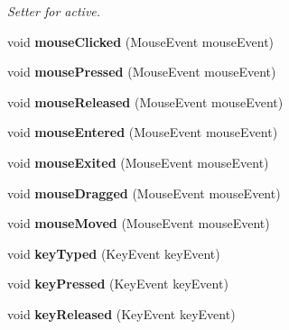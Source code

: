 \begin{DoxyCompactItemize}
\begin{DoxyCompactList}\small\item\em Setter for active. \end{DoxyCompactList}\item 
void {\bfseries mouse\+Clicked} (Mouse\+Event mouse\+Event)\hypertarget{classGUIListener_ab0cfe7af17bab2decc326dc1a0b0373b}{}\label{classGUIListener_ab0cfe7af17bab2decc326dc1a0b0373b}

\item 
void {\bfseries mouse\+Pressed} (Mouse\+Event mouse\+Event)\hypertarget{classGUIListener_a924b03b8a466f02543597017825c92a0}{}\label{classGUIListener_a924b03b8a466f02543597017825c92a0}

\item 
void {\bfseries mouse\+Released} (Mouse\+Event mouse\+Event)\hypertarget{classGUIListener_ad9d4c366f5e965a2859d34008021296e}{}\label{classGUIListener_ad9d4c366f5e965a2859d34008021296e}

\item 
void {\bfseries mouse\+Entered} (Mouse\+Event mouse\+Event)\hypertarget{classGUIListener_a3a714ed0ff377a41d830a884adfe20e5}{}\label{classGUIListener_a3a714ed0ff377a41d830a884adfe20e5}

\item 
void {\bfseries mouse\+Exited} (Mouse\+Event mouse\+Event)\hypertarget{classGUIListener_aa4038ada664a15857dc2dea6ef19361c}{}\label{classGUIListener_aa4038ada664a15857dc2dea6ef19361c}

\item 
void {\bfseries mouse\+Dragged} (Mouse\+Event mouse\+Event)\hypertarget{classGUIListener_a03270bb04cc49e7cc40a07cec897a03d}{}\label{classGUIListener_a03270bb04cc49e7cc40a07cec897a03d}

\item 
void {\bfseries mouse\+Moved} (Mouse\+Event mouse\+Event)\hypertarget{classGUIListener_acfd39f94b381ec2fd3653bb18137a3a0}{}\label{classGUIListener_acfd39f94b381ec2fd3653bb18137a3a0}

\item 
void {\bfseries key\+Typed} (Key\+Event key\+Event)\hypertarget{classGUIListener_a7aacf142d63f4ef87009903be279ad70}{}\label{classGUIListener_a7aacf142d63f4ef87009903be279ad70}

\item 
void {\bfseries key\+Pressed} (Key\+Event key\+Event)\hypertarget{classGUIListener_a469eaac915f1d10930dcdde8feec3fb5}{}\label{classGUIListener_a469eaac915f1d10930dcdde8feec3fb5}

\item 
void {\bfseries key\+Released} (Key\+Event key\+Event)\hypertarget{classGUIListener_a0384d5954bf3864eeafd989d34f102ad}{}\label{classGUIListener_a0384d5954bf3864eeafd989d34f102ad}

\end{DoxyCompactItemize}


